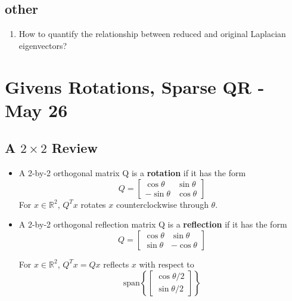 \documentclass[a4paper]{article}
\newcommand{\R}{\mathbb{R}}
\begin{document}
\subsection{other}
\begin{enumerate}
\item How to quantify the relationship between reduced and original Laplacian eigenvectors?
\end{enumerate}
\newpage
\section{Givens Rotations, Sparse QR - May 26}

\subsection{A $2\times 2$ Review}
\begin{itemize}
\item A 2-by-2 orthogonal matrix Q is a \textbf{rotation} if it has the form 
\[
Q = \begin{bmatrix}
    \cos\theta & \sin\theta \\
    -\sin\theta & \cos\theta
\end{bmatrix}\]
For $x \in \R^2$, $Q^Tx$ rotates $x$ counterclockwise through $\theta$.

\item A 2-by-2 orthogonal reflection matrix Q is a \textbf{reflection} if it has the form 
\[
Q = \begin{bmatrix}
    \cos\theta & \sin\theta \\
    \sin\theta & -\cos\theta
\end{bmatrix}\]

For $x \in \R^2$, $Q^Tx = Qx$ reflects $x$ with respect to 
$$\text{span}\left \{\begin{bmatrix}
    \cos\theta/2 \\
    \sin\theta/2
\end{bmatrix}\right \}$$
\end{itemize}
\end{document}
